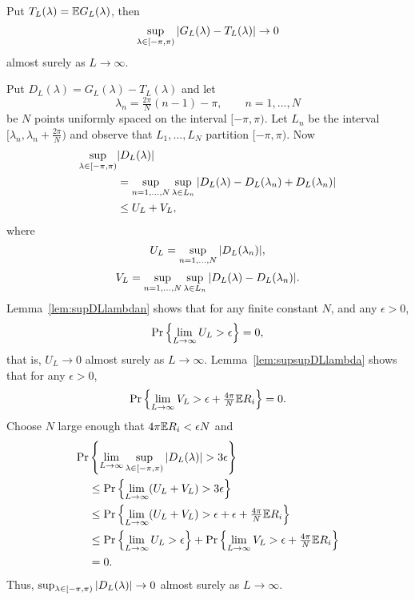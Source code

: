 \documentclass[journal]{IEEEtran}
\begin{document}
\begin{lemma}\label{lem:uniflawTGL} 
Put $T_L(\lambda) = {\mathbb E} G_L(\lambda)$, then
\[
\sup_{\lambda \in [-\pi, \pi)}{\vert G_L(\lambda) - T_L(\lambda) \vert} \rightarrow 0
\] 
almost surely as $L \rightarrow \infty$.
\end{lemma}
\begin{IEEEproof}
Put $D_L(\lambda) = G_L(\lambda) - T_L(\lambda)$ and let
\[
\lambda_n = \tfrac{2\pi}{N}(n-1) - \pi, \qquad n = 1, \dots, N
\]
be $N$ points uniformly spaced on the interval $[-\pi, \pi)$.  Let $L_n$ be the interval $[\lambda_n, \lambda_n + \tfrac{2\pi}{N})$ and observe that $L_1, \dots, L_N$ partition $[-\pi, \pi)$.  Now
\begin{align*}
\sup_{\lambda \in [-\pi, \pi)}&{\vert D_L(\lambda) \vert} \\
&= \sup_{n = 1,\dots,N}\sup_{\lambda \in L_n}{\vert D_L(\lambda) - D_L(\lambda_n) + D_L(\lambda_n) \vert} \\
&\leq U_L + V_L,
\end{align*}
where 
\[
U_L = \sup_{n = 1,\dots,N}{\vert D_L(\lambda_n) \vert},
\]
\[
V_L = \sup_{n = 1,\dots,N}\sup_{\lambda \in L_n}{\vert D_L(\lambda) - D_L(\lambda_n) \vert}.
\]
Lemma~\ref{lem:supDLlambdan} shows that for any finite constant $N$, and any $\epsilon > 0$, 
\[
{\operatorname{Pr}}\left\{ \lim_{L\rightarrow\infty} U_L > \epsilon \right\} = 0,
\]
that is, $U_L \rightarrow 0$ almost surely as $L\rightarrow\infty$.  Lemma~\ref{lem:supsupDLlambda} shows that for any $\epsilon > 0$,
\[
{\operatorname{Pr}}\left\{ \lim_{L \rightarrow \infty} V_L > \epsilon + \tfrac{4\pi }{N}{\mathbb E} R_i \right\} = 0.
\] 
Choose $N$ large enough that $4\pi{\mathbb E} R_i < \epsilon N$ and
\begin{align*}
{\operatorname{Pr}}& \left\{ \lim_{L\rightarrow\infty} \sup_{\lambda \in [-\pi, \pi)}{\vert D_L(\lambda) \vert} > 3\epsilon \right\} \\
&\leq {\operatorname{Pr}}\left\{\lim_{L\rightarrow\infty}(U_L + V_L) > 3\epsilon \right\} \\
&\leq {\operatorname{Pr}}\left\{\lim_{L\rightarrow\infty} (U_L + V_L) > \epsilon + \epsilon + \tfrac{4\pi }{N}{\mathbb E} R_i \right\} \\
&\leq {\operatorname{Pr}}\left\{\lim_{L\rightarrow\infty} U_L > \epsilon\right\} +  {\operatorname{Pr}}\left\{ \lim_{L\rightarrow\infty} V_L > \epsilon + \tfrac{4\pi }{N}{\mathbb E} R_i \right\} \\
&= 0.
\end{align*}
Thus, $\sup_{\lambda \in [-\pi, \pi)}{\vert D_L(\lambda) \vert} \rightarrow 0$ almost surely as $L\rightarrow\infty$.
\end{IEEEproof}
\end{document}
